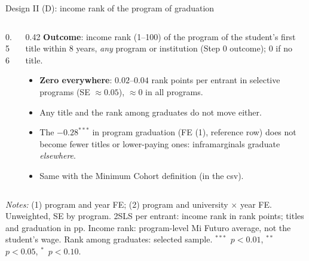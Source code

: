 \documentclass{beamer}
\newcommand{\sym}[1]{\ensuremath{^{#1}}}
\begin{document}
\begin{frame}[label=d2-incrank]{Design II (D): income rank of the program of graduation}
\begin{columns}[T,onlytextwidth]
\begin{column}{0.56\textwidth}
\centering
\tiny
\resizebox{\linewidth}{!}{}
\end{column}
\begin{column}{0.42\textwidth}
\scriptsize
\textbf{Outcome}: income rank (1--100) of the program of the student's first title within 8 years, \emph{any} program or institution (Step 0 outcome); 0 if no title.
\begin{itemize}
    \setlength{\itemsep}{3pt}
    \item \textbf{Zero everywhere}: $0.02$--$0.04$ rank points per entrant in selective programs (SE $\approx 0.05$), $\approx 0$ in all programs.
    \item Any title and the rank among graduates do not move either.
    \item The $-0.28^{***}$ in program graduation (FE (1), reference row) does not become fewer titles or lower-paying ones: inframarginals graduate \emph{elsewhere}.
    \item Same with the Minimum Cohort definition (in the csv).
\end{itemize}
\end{column}
\end{columns}

\vspace{0.06cm}
\parbox{0.97\textwidth}{\tiny \textit{Notes:} (1) program and year FE; (2) program and university $\times$ year FE. Unweighted, SE by program. 2SLS per entrant: income rank in rank points; titles and graduation in pp. Income rank: program-level Mi Futuro average, not the student's wage. Rank among graduates: selected sample. \sym{***}~$p<0.01$, \sym{**}~$p<0.05$, \sym{*}~$p<0.10$.}
\end{frame}
\end{document}
